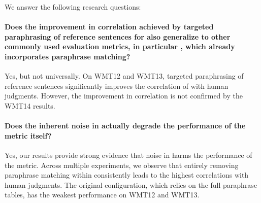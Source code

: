 \begin{mdframed}[
    linecolor=gray,
    linewidth=2pt,
    roundcorner=5,
    backgroundcolor=gray!5
]
\noindent 
We answer the following research questions:

\paragraph{Does the improvement in correlation achieved by targeted paraphrasing of reference sentences for \bleu also generalize to other commonly used evaluation metrics, in particular \mn, which already incorporates paraphrase matching?}
Yes, but not universally. On WMT12 and WMT13, targeted paraphrasing of reference sentences significantly improves the correlation of \mn with human judgments. However, the improvement in correlation is not confirmed by the WMT14 results.

\paragraph{Does the inherent noise in \cmpt actually degrade the performance of the \mn metric itself?}
Yes, our results provide strong evidence that noise in \cmpt harms the performance of the \mn metric. Across multiple experiments, we observe that entirely removing paraphrase matching within \mn consistently leads to the highest correlations with human judgments. The original \mn configuration, which relies on the full paraphrase tables, has the weakest performance on WMT12 and WMT13. 

\end{mdframed}

